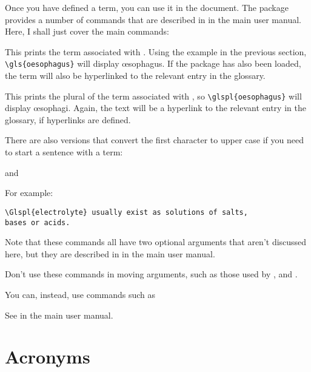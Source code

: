 \documentclass{nlctdoc}
\begin{document}
Once you have defined a term, you can use it in the document. The
 package provides a number of commands that are
described in  in the main  user manual.
Here, I shall just cover the main commands:
\begin{definition}
\end{definition}
This prints the term associated with . Using the
example in the previous section, \verb|\gls{oesophagus}|
will display \oe sophagus. If the  package has also
been loaded, the term will also be hyperlinked to the relevant
entry in the glossary.
\begin{definition}
\end{definition}
This prints the plural of the term associated with ,
so \verb|\glspl{oesophagus}| will display \oe sophagi. Again, the
text will be a hyperlink to the relevant entry in the glossary, if
hyperlinks are defined.

There are also versions that convert the first character to upper
case if you need to start a sentence with a term:
\begin{definition}
\end{definition}
and
\begin{definition}
\end{definition}
For example:
\begin{verbatim}
\Glspl{electrolyte} usually exist as solutions of salts, 
bases or acids.
\end{verbatim}

Note that these commands all have two optional arguments that aren't
discussed here, but they are described in
 in the main  user manual.

\begin{important}
Don't use these commands in moving arguments, such
as those used by ,  and .
\end{important}
You can, instead, use commands such as
\begin{definition}
\end{definition}
See  in the main  user manual.

\section{Acronyms}
\label{acronyms}
\end{document}
